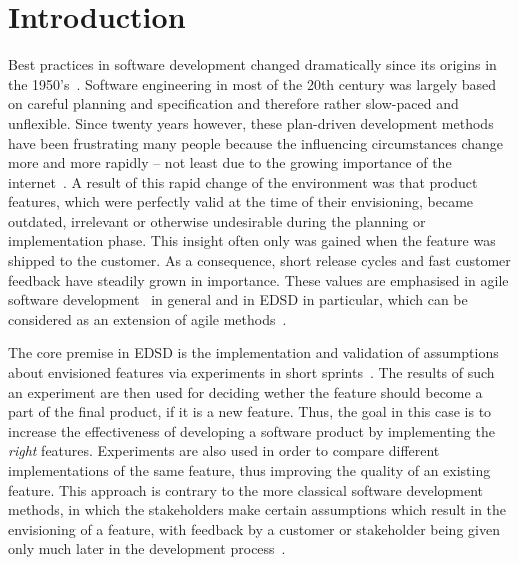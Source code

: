 %
\chapter{Introduction}
\label{sec:intro}

Best practices in software development changed dramatically since its origins in the 1950's~\cite{boehm2006view}.
Software engineering in most of the 20th century was largely based on careful planning and specification and therefore rather slow-paced and unflexible.
Since twenty years however, these plan-driven development methods have been frustrating many people because the influencing circumstances change more and more rapidly -- not least due to the growing importance of the internet~\cite{Williams2003}.
A result of this rapid change of the environment was that product features, which were perfectly valid at the time of their envisioning, became outdated, irrelevant or otherwise undesirable during the planning or implementation phase.
This insight often only was gained when the feature was shipped to the customer.
As a consequence, short release cycles and fast customer feedback have steadily grown in importance.
These values are emphasised in agile software development~\cite{fowler2001agile} in general and in \ac{EDSD} in particular, which can be considered as an extension of agile methods~\cite{Bosch2012}.

The core premise in \ac{EDSD} is the implementation and validation of assumptions about envisioned features via experiments in short sprints~\cite{Lindgren2015}.
The results of such an experiment are then used for deciding wether the feature should become a part of the final product, if it is a new feature.
Thus, the goal in this case is to increase the effectiveness of developing a software product by implementing the \emph{right} features.
Experiments are also used in order to compare different implementations of the same feature, thus improving the quality of an existing feature.
This approach is contrary to the more classical software development methods, in which the stakeholders make certain assumptions which result in the envisioning of a feature, with feedback by a customer or stakeholder being given only much later in the development process~\cite{Bosch2012}.

